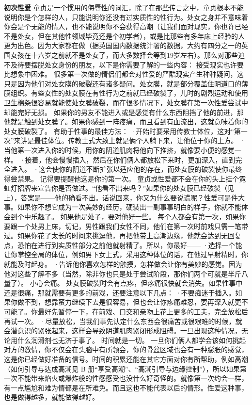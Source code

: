 \documentclass[12pt,UTF8,openany]{ctexbook}
\begin{document}
\textbf{初次性爱}
童贞是一个惯用的侮辱性的词汇，除了在那些传言之中，童贞根本不能说明你是个怎样的人，只能说明你还没有过实质性的性行为。处女之身并不意味着你会是个无能的情人，也不能说明你不会获得高潮（让我们面对现实，你也许已经不是处女，但在其他性领域毕竟还是个初学者），或是比那些有多年床上经验的人更为出色。因为大家都在做（据英国国内数据统计署的数据，大约有四分之一的英国女孩在十六岁之前就不是处女了，而大多数择会等到19岁左右）。那么对那些迫不及待要摆脱处女身份的朋友，以下是你需要了解的一些内容：
接受现实也许要比想象中困难。
很多第一次做的情侣们都会对性爱的严酷现实产生种种疑问，这只是因为他们对处女膜的破裂还有诸多疑问。处女膜，就是部分覆盖住阴道口的薄膜组织。有些女性的处女膜在有性行为之前就已经破裂了，儿时的剧烈运动和使用卫生棉条很容易就能使处女膜破裂，而在很多情况下，处女膜在第一次性爱尝试中却能完好无损。
如果你的男友不能进入或是感觉有什么东西阻挡了他的前进，那他就是触到处女膜了。如果你感到一阵疼痛，而且看到有血流出，这就意味着你的处女膜破裂了。
有助于性事的最佳方法：
·开始时要采用传教士体位，这对“第一次”来讲是最佳体位。传教士式大致上就是俩个人躺下来，让他位于你的上方。
·当他第一次进入你的时候，用你的阴道肌肉将他向下推挤，就像要小便的感觉一样。
·接着，他会慢慢插入，然后在你们俩人都放松下来时，更加深入，直到完全进入。
·这会使你的阴道不断扩张以适应他的存在，而处女膜的破裂使你最终得尝禁果。
记得要提醒他这是你的第一次。
童贞或性爱都不会在你的头上挂个霓虹灯招牌来宣告你是否做过。“他看不出来吗？”如果你的处女膜已经破裂（见上），答案是——他的确看不出。话说回来，你又为什么要说谎呢？性爱可是件大事。如果你不想它成为一次美妙的经历，硬装出一副事事明白的样子，你就不能体会到个中乐趣了。
如果他是处子，要对他好一些。
每个人都会有第一次，如果你要跟一个处男上床，切记，男性跟我们女性不同，他们在第一次时前戏只需一笔带过。如果你花了太长的时间来挑逗他，再把他带上高潮边缘，他就会达到无回复点，恐怕在进行到实质性部分之前他就射精了。所以，你最好——
·选择一个能让你掌控全局的体位，例如男下女上式，采用这种体位的话，在他过早射精时，你就能及时起身。
·告诉他你喜欢怎样的触摸，怎样做会让你有美妙的感觉。因为他对这些了解不多（当然，除非你也只是处于尝试阶段，那你们两个可就是半斤八量了）。
小心会痛。
处女膜破裂时会有点疼，但疼痛很快就会消失。如果性事中还是很痛，那就需要有更多的前戏，还要注意以下几点：
·不要痴迷于插入。如果你做不到，想靠蛮力继续下去是很容易，但也会让你疼痛难忍，要再深入就更不可能了。你最好先暂停一下，在前戏、口交和亲吻上花上更多的工夫，完全放松后再试一次。
·尽量放松，当我们事先认定什么东西会很痛苦或很艰难的时候，就会潜意识的紧张起来，这样会导致阴道肌肉紧闭形成阻碍。一旦出现这种情况，无论用什么润滑剂也无济于事了。
时间就是一切。
一旦你们俩人都学会该如何挑起对方的激情，你不仅会在头脑中有所领会，你的骨盆区域也会有一种膨胀的感觉，这是你已经做好准备的信号。时间的积累还能在其它方面对你有所帮助，例如高潮（如何引导与达成高潮见 B 册“享受高潮”、“高潮引导与边缘控制”），所以如果第一次不能带来焰火或爆炸般的性感感受也没什么好奇怪的。就像第一次约会一样，有一点尴尬和难为情都是在所难免。而且这也不能代表以后的情形。性爱这种事，也是做得越多，就能做得越好。
\end{document}
